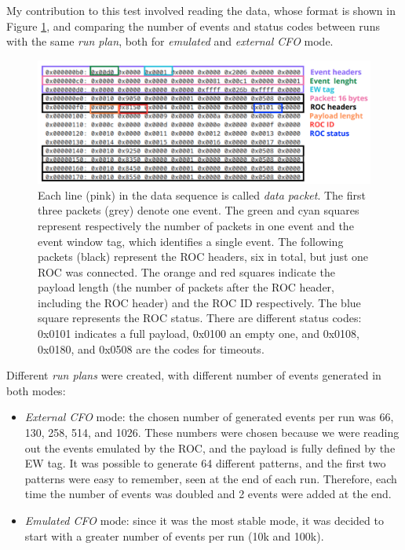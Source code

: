 My contribution to this test involved reading the data, whose format is shown in Figure \ref{fig:dataformat}, 
and comparing the number of events and status codes between runs with the same \textit{run plan}, 
both for \textit{emulated} and \textit{external CFO} mode. 
\begin{figure}[!h]
  \centering
  \includegraphics[width=\textwidth]{figures/png/Screenshot_20240628_104216.png}
  \caption{Each line (pink) in the data sequence is called \textit{data packet}. 
  The first three packets (grey) denote one event. The green and cyan squares represent respectively
  the number of packets in one event and the event window tag, which identifies a single event. 
  The following packets (black) represent the ROC headers, six in total, but just one ROC was connected. 
  The orange and red squares indicate the payload length (the number of packets after 
  the ROC header, including the ROC header) and the ROC ID respectively. The blue square represents 
  the ROC status. There are different status codes: 0x0101 indicates a full payload, 0x0100 an empty one, 
  and 0x0108, 0x0180, and 0x0508 are the codes for timeouts.}
  \label{fig:dataformat}
\end{figure}
Different \textit{run plans} were created, with different number of events generated in both modes:
\begin{itemize}
  \item \textit{External CFO} mode: the chosen number of generated 
  events per run was 66, 130, 258, 514, and 1026. These numbers 
  were chosen because we were reading out the events emulated by 
  the ROC, and the payload is fully defined by the EW tag. 
  It was possible to generate 64 different patterns, and the 
  first two patterns were easy to remember, seen at the end of each run. 
  Therefore, each time the number of events was doubled and 2 events were added at the end.
  \item \textit{Emulated CFO} mode: since it was the most stable mode, 
  it was decided to start with a greater number of events per run (10k and 100k).
\end{itemize}


